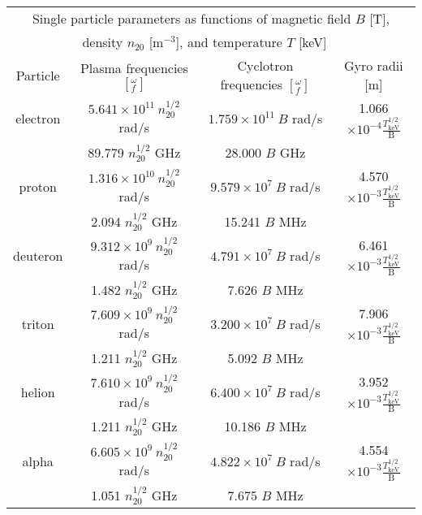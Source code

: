 \noindent
\begin{table}[h!]
  \centering
  \begin{tabular}{c c c c}
    \multicolumn{4}{c}{Single particle parameters as functions of magnetic field $B$ [T],}\\
    \multicolumn{4}{c}{density $n_{20}$ [m$^{-3}$], and temperature $T$ [keV]~~\cite{authors}}\\
    \hline
    Particle \T\B& Plasma frequencies $\left[ ^{\omega}_{f} \right]$ & Cyclotron frequencies $\left[^{\omega}_{f}\right]$ & Gyro radii [m]\\
    \hline\hline
    electron \T& $5.641\times 10^{11}~n_{20}^{1/2}$ rad/s & $ 1.759\times 10^{11}~B$ rad/s & 1.066$\times10^{-4}\frac{T_\mathrm{keV}^{1/2}}{\textrm{B}}$\\
             & 89.779 $n_{20}^{1/2}$ GHz                  & 28.000 $B$ GHz                 &                                        \\[4pt]
    proton   & $1.316\times 10^{10}~n_{20}^{1/2}$ rad/s   & $ 9.579\times 10^7~B$ rad/s    & 4.570$\times10^{-3}\frac{T_\mathrm{keV}^{1/2}}{\textrm{B}}$\\
             & 2.094 $n_{20}^{1/2}$ GHz                   & 15.241 $B$ MHz                 &                                        \\[4pt]  
    deuteron & $9.312\times 10^9~n_{20}^{1/2}$ rad/s      & $ 4.791\times 10^7~B$ rad/s    & 6.461$\times10^{-3}\frac{T_\mathrm{keV}^{1/2}}{\textrm{B}}$\\
             & 1.482 $n_{20}^{1/2}$ GHz                   & 7.626 $B$ MHz                  &                                        \\[4pt]
    triton   & $7.609\times 10^9~n_{20}^{1/2}$ rad/s      & $ 3.200\times 10^7~B$ rad/s    & 7.906$\times10^{-3}\frac{T_\mathrm{keV}^{1/2}}{\textrm{B}}$\\
             & 1.211 $n_{20}^{1/2}$ GHz                   & 5.092 $B$  MHz                 &                                        \\[4pt]
    helion   & $7.610\times 10^{9}~n_{20}^{1/2}$ rad/s    & $ 6.400\times 10^7~B$ rad/s    & 3.952$\times10^{-3}\frac{T_\mathrm{keV}^{1/2}}{\textrm{B}}$\\
             & 1.211 $n_{20}^{1/2}$ GHz                   & 10.186 $B$ MHz                 &                                        \\[4pt]
    alpha    & $6.605\times 10^{9}~n_{20}^{1/2}$ rad/s    & $ 4.822\times 10^7~B$ rad/s    & 4.554$\times10^{-3}\frac{T_\mathrm{keV}^{1/2}}{\textrm{B}}$\\
             \B& 1.051 $n_{20}^{1/2}$ GHz                 & 7.675 $B$ MHz                  &                                        \\[4pt]
    \hline
    \end{tabular}
  \label{Table:plasmaFreq}
\end{table}

